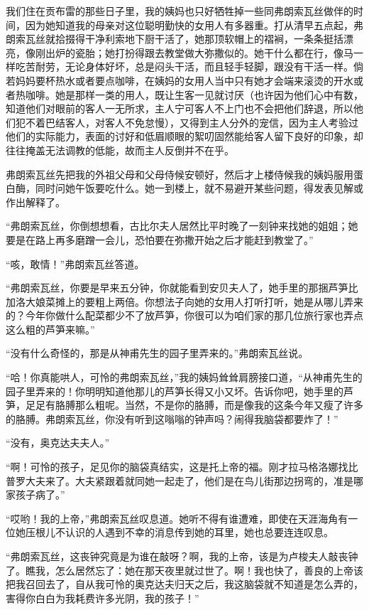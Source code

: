 \par 我们住在贡布雷的那些日子里，我的姨妈也只好牺牲掉一些同弗朗索瓦丝做伴的时间，因为她知道我的母亲对这位聪明勤快的女用人有多器重。打从清早五点起，弗朗索瓦丝就拾掇得干净利索地下厨干活了，她那顶软帽上的褶裥，一条条挺括漂亮，像刚出炉的瓷胎；她打扮得跟去教堂做大弥撒似的。她干什么都在行，像马一样吃苦耐劳，无论身体好坏，总是闷头干活，而且轻手轻脚，跟没有干活一样。倘若妈妈要杯热水或者要点咖啡，在姨妈的女用人当中只有她才会端来滚烫的开水或者热咖啡。她是那样一类的用人，既让生客一见就讨厌（也许因为他们心中有数，知道他们对眼前的客人一无所求，主人宁可客人不上门也不会把他们辞退，所以他们犯不着巴结客人，对客人不免怠慢），又得到主人分外的宠信，因为主人考验过他们的实际能力，表面的讨好和低眉顺眼的絮叨固然能给客人留下良好的印象，却往往掩盖无法调教的低能，故而主人反倒并不在乎。
\par 弗朗索瓦丝先把我的外祖父母和父母侍候安顿好，然后才上楼侍候我的姨妈服用蛋白酶，同时问她午饭要吃什么。她一到楼上，就不易避开某些问题，得发表见解或作出解释了。
\par “弗朗索瓦丝，你倒想想看，古比尔夫人居然比平时晚了一刻钟来找她的姐姐；她要是在路上再多磨蹭一会儿，恐怕要在弥撒开始之后才能赶到教堂了。”
\par “咳，敢情！”弗朗索瓦丝答道。
\par “弗朗索瓦丝，你要是早来五分钟，你就能看到安贝夫人了，她手里的那捆芦笋比加洛大娘菜摊上的要粗上两倍。你想法子向她的女用人打听打听，她是从哪儿弄来的？今年你做什么配菜都少不了放芦笋，你很可以为咱们家的那几位旅行家也弄点这么粗的芦笋来嘛。”
\par “没有什么奇怪的，那是从神甫先生的园子里弄来的。”弗朗索瓦丝说。
\par “哈！你真能哄人，可怜的弗朗索瓦丝，”我的姨妈耸耸肩膀接口道，“从神甫先生的园子里弄来的！你明明知道他那儿的芦笋长得又小又坏。告诉你吧，她手里的芦笋，足足有胳膊那么粗呢。当然，不是你的胳膊，而是像我的这条今年又瘦了许多的胳膊。弗朗索瓦丝，你没有听到这嗡嗡的钟声吗？闹得我脑袋都要炸了！”
\par “没有，奥克达夫夫人。”
\par “啊！可怜的孩子，足见你的脑袋真结实，这是托上帝的福。刚才拉马格洛娜找比普罗大夫来了。大夫紧跟着就同她一起走了，他们是在鸟儿街那边拐弯的，准是哪家孩子病了。”
\par “哎哟！我的上帝，”弗朗索瓦丝叹息道。她听不得有谁遭难，即使在天涯海角有一位她压根儿不认识的人遇到不幸的消息传到她的耳里，她也总要连连叹息。
\par “弗朗索瓦丝，这丧钟究竟是为谁在敲呀？啊，我的上帝，该是为卢梭夫人敲丧钟了。瞧我，怎么居然忘了：她在那天夜里就过世了。啊！我也快了，善良的上帝该把我召回去了，自从我可怜的奥克达夫归天之后，我这脑袋就不知道是怎么弄的，害得你白白为我耗费许多光阴，我的孩子！”
